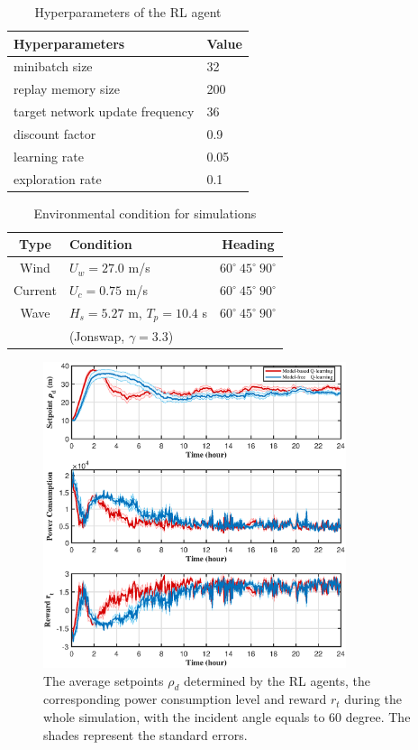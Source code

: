 \begin{sloppypar}
\begin{table}[ht!]
	\caption{Hyperparameters of the RL agent}
	\begin{center}
		\label{table_network}
		\begin{tabular}{l l}
			\hline
			Hyperparameters & Value \\
			\hline
			minibatch size & 32 \\
			replay memory size & 200 \\
			target network update frequency & 36 \\
			discount factor & 0.9 \\
			learning rate & 0.05 \\
			exploration rate & 0.1 \\
			\hline
		\end{tabular}
	\end{center}
\end{table}

\begin{table}[ht!]
	\caption{Environmental condition for simulations}
	\begin{center}
		\label{table_env_simulation}
		\begin{tabular}{c l c}
			\hline
			Type & Condition &  Heading \\
			\hline
			Wind & $U_w = 27.0$ m/s & $60^\circ \ 45^\circ \ 90^\circ$ \\
			Current & $U_c = 0.75$ m/s & $60^\circ \ 45^\circ \ 90^\circ$ \\
			Wave & $H_s = 5.27$ m, $T_p = 10.4$ s & $60^\circ \ 45^\circ \ 90^\circ$ \\
			& (Jonswap, $\gamma=3.3$) & \\
			\hline
		\end{tabular}
	\end{center}
\end{table}

\begin{figure}[!htp]
	\centering
	\includegraphics[width=3.5in]{Images/60_comparison.eps}
	\caption{The average setpoints $\rho_d$ determined by the RL agents, the corresponding  power consumption level and reward $r_t$ during the whole simulation, with the incident angle equals to 60 degree. The shades represent the standard errors.}
	\label{fig:rl_sim_60}
\end{figure}


\end{sloppypar}
